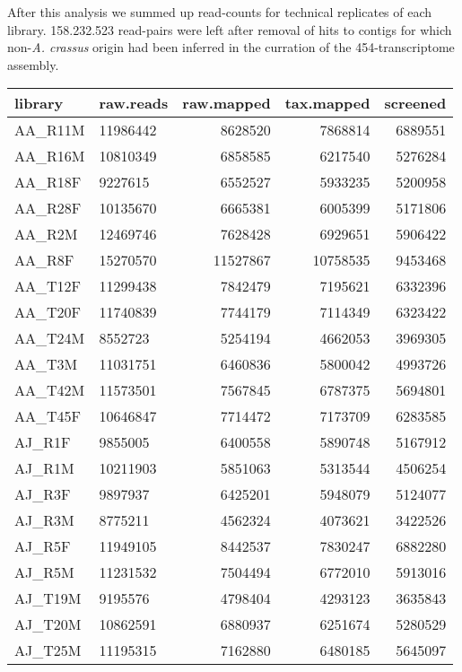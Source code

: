 After this analysis we summed up read-counts for technical replicates
of each library. 158.232.523 read-pairs were left after removal of
hits to contigs for which non-\textit{A. crassus} origin had been
inferred in the curration of the 454-transcriptome assembly.

\begin{table}[h]
\begin{center}
\begin{tabular}{llrrr}
  \hline
library & raw.reads & raw.mapped & tax.mapped & screened \\ 
  \hline
AA\_R11M & 11986442 & 8628520 & 7868814 & 6889551 \\ 
  AA\_R16M & 10810349 & 6858585 & 6217540 & 5276284 \\ 
  AA\_R18F & 9227615 & 6552527 & 5933235 & 5200958 \\ 
  AA\_R28F & 10135670 & 6665381 & 6005399 & 5171806 \\ 
  AA\_R2M & 12469746 & 7628428 & 6929651 & 5906422 \\ 
  AA\_R8F & 15270570 & 11527867 & 10758535 & 9453468 \\ 
  AA\_T12F & 11299438 & 7842479 & 7195621 & 6332396 \\ 
  AA\_T20F & 11740839 & 7744179 & 7114349 & 6323422 \\ 
  AA\_T24M & 8552723 & 5254194 & 4662053 & 3969305 \\ 
  AA\_T3M & 11031751 & 6460836 & 5800042 & 4993726 \\ 
  AA\_T42M & 11573501 & 7567845 & 6787375 & 5694801 \\ 
  AA\_T45F & 10646847 & 7714472 & 7173709 & 6283585 \\ 
  AJ\_R1F & 9855005 & 6400558 & 5890748 & 5167912 \\ 
  AJ\_R1M & 10211903 & 5851063 & 5313544 & 4506254 \\ 
  AJ\_R3F & 9897937 & 6425201 & 5948079 & 5124077 \\ 
  AJ\_R3M & 8775211 & 4562324 & 4073621 & 3422526 \\ 
  AJ\_R5F & 11949105 & 8442537 & 7830247 & 6882280 \\ 
  AJ\_R5M & 11231532 & 7504494 & 6772010 & 5913016 \\ 
  AJ\_T19M & 9195576 & 4798404 & 4293123 & 3635843 \\ 
  AJ\_T20M & 10862591 & 6880937 & 6251674 & 5280529 \\ 
  AJ\_T25M & 11195315 & 7162880 & 6480185 & 5645097 \\ 

\end{tabular}
\end{center}
\end{table}
